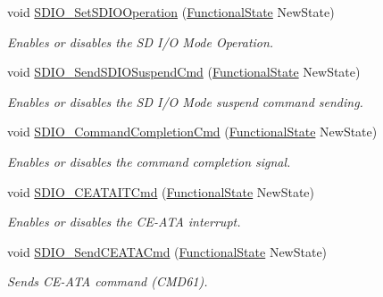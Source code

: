 \begin{DoxyCompactItemize}
void \mbox{\hyperlink{group___s_d_i_o___private___functions_ga24e210c185d5a7855cbaff4472a8f8d1}{S\+D\+I\+O\+\_\+\+Set\+S\+D\+I\+O\+Operation}} (\mbox{\hyperlink{group___exported__types_gac9a7e9a35d2513ec15c3b537aaa4fba1}{Functional\+State}} New\+State)
\begin{DoxyCompactList}\small\item\em Enables or disables the SD I/O Mode Operation. \end{DoxyCompactList}\item 
void \mbox{\hyperlink{group___s_d_i_o___private___functions_ga9264137a01a1ab81d03bc80a3b3120fc}{S\+D\+I\+O\+\_\+\+Send\+S\+D\+I\+O\+Suspend\+Cmd}} (\mbox{\hyperlink{group___exported__types_gac9a7e9a35d2513ec15c3b537aaa4fba1}{Functional\+State}} New\+State)
\begin{DoxyCompactList}\small\item\em Enables or disables the SD I/O Mode suspend command sending. \end{DoxyCompactList}\item 
void \mbox{\hyperlink{group___s_d_i_o___private___functions_ga1bbe98c629812bc62121d9c8b2c5e21b}{S\+D\+I\+O\+\_\+\+Command\+Completion\+Cmd}} (\mbox{\hyperlink{group___exported__types_gac9a7e9a35d2513ec15c3b537aaa4fba1}{Functional\+State}} New\+State)
\begin{DoxyCompactList}\small\item\em Enables or disables the command completion signal. \end{DoxyCompactList}\item 
void \mbox{\hyperlink{group___s_d_i_o___private___functions_gab44b8cbc21be000a291563076159503b}{S\+D\+I\+O\+\_\+\+C\+E\+A\+T\+A\+I\+T\+Cmd}} (\mbox{\hyperlink{group___exported__types_gac9a7e9a35d2513ec15c3b537aaa4fba1}{Functional\+State}} New\+State)
\begin{DoxyCompactList}\small\item\em Enables or disables the C\+E-\/\+A\+TA interrupt. \end{DoxyCompactList}\item 
void \mbox{\hyperlink{group___s_d_i_o___private___functions_ga8dc7f17804bdb745b42f6647c8487b4c}{S\+D\+I\+O\+\_\+\+Send\+C\+E\+A\+T\+A\+Cmd}} (\mbox{\hyperlink{group___exported__types_gac9a7e9a35d2513ec15c3b537aaa4fba1}{Functional\+State}} New\+State)
\begin{DoxyCompactList}\small\item\em Sends C\+E-\/\+A\+TA command (C\+M\+D61). \end{DoxyCompactList}\item 

\end{DoxyCompactItemize}
